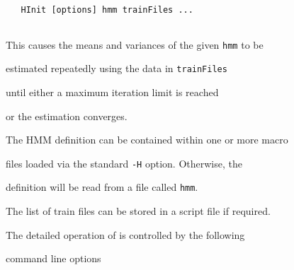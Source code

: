 \begin{verbatim}


   HInit [options] hmm trainFiles ...


\end{verbatim}


This causes the means and variances of the given {\tt hmm} to be


estimated repeatedly using the data in {\tt trainFiles} 


until either a maximum iteration limit is reached


or the estimation converges.


The HMM definition can be contained within one or more macro


files loaded via the standard \texttt{-H} option.  Otherwise, the 


definition will be read from a file called \texttt{hmm}.


The list of train files can be stored in a script file if required.





The detailed operation of  is controlled by the following


command line options


